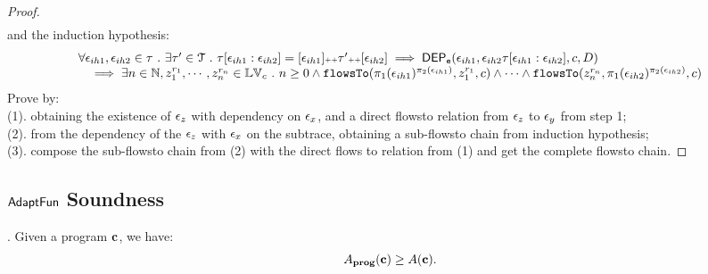 \begin{proof}
\[\begin{array}{l}
	\end{array}
\]
and the induction hypothesis:
\[
  \begin{array}{l}
    \forall \mathtt{\epsilon}_{ih1}, \mathtt{\epsilon}_{ih2} \in \mathtt{\tau} ~.~
		 \exists \mathtt{\tau}' \in \mathcal{T} ~.~ 
     \mathtt{\tau}[\mathtt{\epsilon}_{ih1}:\mathtt{\epsilon}_{ih2}] = [\mathtt{\epsilon}_{ih1}] {\scriptscriptstyle ++} \mathtt{\tau}' {\scriptscriptstyle ++} [\mathtt{\epsilon}_{ih2}]
		\implies
		\mathsf{DEP_{\mathtt{e}}}(\mathtt{\epsilon}_{ih1}, \mathtt{\epsilon}_{ih2} \mathtt{\tau}[\mathtt{\epsilon}_{ih1}:\mathtt{\epsilon}_{ih2}], c, D) 
		\\ \quad 
		\implies 
    \exists n \in \mathbb{N}, z_1^{r_1}, \cdots, z_n^{r_n} \in \mathbb{LV}_{{c}} ~.~ n \geq 0 \land
		\mathtt{flowsTo}(\pi_1(\mathtt{\epsilon}_{ih1})^{\pi_2(\mathtt{\epsilon}_{ih1})},  z_1^{r_1}, c) 
    \land \cdots \land \mathtt{flowsTo}(z_n^{r_n}, \pi_1(\mathtt{\epsilon}_{ih2})^{\pi_2(\mathtt{\epsilon}_{ih2})}, c) 
  \end{array}
  \]
%
Prove by:
\\
(1). obtaining the existence of $\mathtt{\epsilon}_z$ with dependency on $\mathtt{\epsilon}_x$, and a direct flowsto relation from $\mathtt{\epsilon}_z$ to $\mathtt{\epsilon}_y$
 from step 1;
 \\
(2). from the dependency of the $\mathtt{\epsilon}_z$ with $\mathtt{\epsilon}_x$ on the subtrace,
 obtaining a sub-flowsto chain from induction  hypothesis;
 \\
(3). compose the sub-flowsto chain from (2) with the  direct flows to relation from (1) and get the complete flowsto chain.
%


\end{proof}

\subsection{$\textsf{AdaptFun}$ Soundness}
{
  \begin{thm}.
  Given a program ${\boldsymbol{\mathbf{c}}}$, we have:
  \[
  A_{\bf{prog}}({\boldsymbol{\mathbf{c}}}) \geq A({\boldsymbol{\mathbf{c}}}).
  \]
  \end{thm}
}

